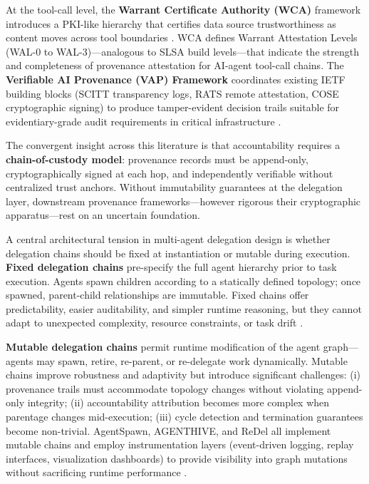 At the tool-call level, the \textbf{Warrant Certificate Authority (WCA)} framework introduces a PKI-like hierarchy that certifies data source trustworthiness as content moves across tool boundaries \cite{wca_2026}. WCA defines Warrant Attestation Levels (WAL-0 to WAL-3)—analogous to SLSA build levels—that indicate the strength and completeness of provenance attestation for AI-agent tool-call chains. The \textbf{Verifiable AI Provenance (VAP) Framework} coordinates existing IETF building blocks (SCITT transparency logs, RATS remote attestation, COSE cryptographic signing) to produce tamper-evident decision trails suitable for evidentiary-grade audit requirements in critical infrastructure \cite{vap_framework_2026}.

The convergent insight across this literature is that accountability requires a \textbf{chain-of-custody model}: provenance records must be append-only, cryptographically signed at each hop, and independently verifiable without centralized trust anchors. Without immutability guarantees at the delegation layer, downstream provenance frameworks—however rigorous their cryptographic apparatus—rest on an uncertain foundation.


A central architectural tension in multi-agent delegation design is whether delegation chains should be fixed at instantiation or mutable during execution. \textbf{Fixed delegation chains} pre-specify the full agent hierarchy prior to task execution. Agents spawn children according to a statically defined topology; once spawned, parent-child relationships are immutable. Fixed chains offer predictability, easier auditability, and simpler runtime reasoning, but they cannot adapt to unexpected complexity, resource constraints, or task drift \cite{agenthive_2025, subagent_architecture_2025}.

\textbf{Mutable delegation chains} permit runtime modification of the agent graph—agents may spawn, retire, re-parent, or re-delegate work dynamically. Mutable chains improve robustness and adaptivity but introduce significant challenges: (i) provenance trails must accommodate topology changes without violating append-only integrity; (ii) accountability attribution becomes more complex when parentage changes mid-execution; (iii) cycle detection and termination guarantees become non-trivial. AgentSpawn, AGENTHIVE, and ReDel all implement mutable chains and employ instrumentation layers (event-driven logging, replay interfaces, visualization dashboards) to provide visibility into graph mutations without sacrificing runtime performance \cite{agentspawn_2025, agenthive_2025, redel_2024}.

